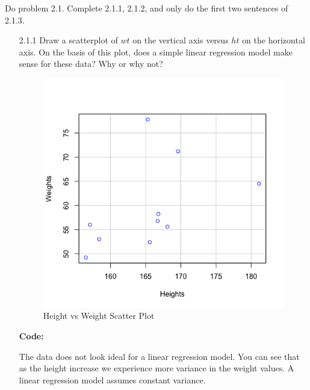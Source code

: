 \documentclass[12pt]{article}
\makeatletter
\theoremstyle{homework}
\newenvironment{exercise}[1]
{\def\@currentlabel{#1}\exercisecore}
{\endexercisecore}
\makeatother
\begin{document}
\begin{exercise}{1} Do problem 2.1. Complete 2.1.1, 2.1.2, and only do the first two sentences of 2.1.3.\\
   \begin{enumerate}
     \item[2.1.1] Draw a scatterplot of $wt$ on the vertical axis versus $ht$ on the horizontal axis. On the basis of this plot, 
     does a simple linear regression model make sense for these data? Why or why not?\\
     \begin{figure}[H]
      \begin{center}
      \caption{Height vs Weight Scatter Plot}
      \includegraphics[width=.66\textwidth]{Rplot.png}
      \end{center}
  \end{figure}
  \textbf{Code:}
        \begin{center}
        
        \end{center} 
  The data does not look ideal for a linear regression model. You can see that as the 
  height increase we experience more variance in the weight values. A linear regression model 
  assumes constant variance.
  \newpage


\end{enumerate}
\end{exercise}
\end{document}
